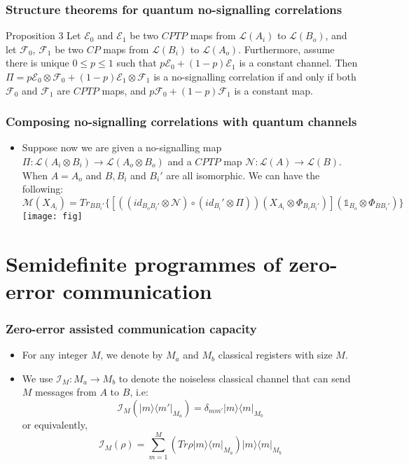 \documentclass{beamer}
\begin{document}
\begin{frame}
\frametitle{Structure theorems for quantum no-signalling correlations}
\begin{block}{Proposition 3}
Let $\mathcal{E}_0$ and $\mathcal{E}_1$ be two $CPTP$ maps from $\mathcal{L}(A_i)$ to $\mathcal{L}(B_o)$, and let $\mathcal{F}_0$, $\mathcal{F}_1$ be two $CP$ maps from $\mathcal{L}(B_i)$ to $\mathcal{L}(A_o)$. Furthermore, assume there is unique $0\leq p \leq 1$ such that $p\mathcal{E}_0+(1-p)\mathcal{E}_1$ is a constant channel. Then $\Pi = p\mathcal{E}_0\otimes\mathcal{F}_0+(1-p)\mathcal{E}_1\otimes\mathcal{F}_1$ is a no-signalling correlation if and only if both $\mathcal{F}_0$ and $\mathcal{F}_1$ are $CPTP$ maps, and $p\mathcal{F}_0+(1-p)\mathcal{F}_1$ is a constant map.
\end{block}
\end{frame}

\begin{frame}
\frametitle{Composing no-signalling correlations with quantum channels}
\begin{itemize}
\item Suppose now we are given a no-signalling map $\Pi:\mathcal{L}(A_i\otimes B_i)\rightarrow \mathcal{L}(A_o\otimes B_o)$ and a $CPTP$ map $\mathcal{N}:\mathcal{L}(A)\rightarrow \mathcal{L}(B)$. When $A=A_o$ and $B,B_i$ and $B_i'$ are all isomorphic. We can have the following:
\[
\mathcal{M}(X_{A_i})=Tr_{BB_i'}\{[((id_{B_oB_i'}\otimes\mathcal{N})\circ (id_{B_i}'\otimes \Pi))(X_{A_i}\otimes\Phi_{B_iB_i'})](\mathds{1}_{B_o}\otimes\Phi_{B B_i'})\}
\]
\texttt{[image: fig]}

\end{itemize}
\end{frame}


\section{Semidefinite programmes of zero-error communication}

\begin{frame}
\frametitle{Zero-error assisted communication capacity}
\begin{itemize}
\item For any integer $M$, we denote by $M_a$ and $M_b$ classical registers with size $M$.
\item We use $\mathcal{I}_M:M_a\rightarrow M_b$ to denote the noiseless classical channel that can send $M$ messages from $A$ to $B$, i.e:
\[
\mathcal{I}_M(|m\rangle\langle m'|_{M_a})=\delta_{mm'}|m\rangle\langle m|_{M_b}
\]
or equivalently,
\[
\mathcal{I}_M(\rho)=\sum_{m=1}^{M}(Tr \rho|m\rangle\langle m|_{M_a})|m\rangle\langle m|_{M_b}
\]
\end{itemize}
\end{frame}
\end{document}
